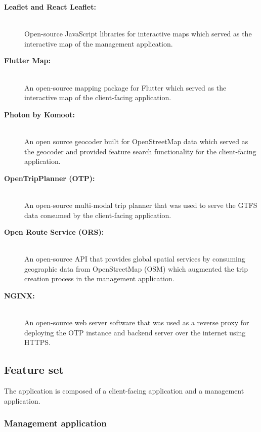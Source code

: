 \documentclass{icsthesis}
\begin{document}
\begin{mainmatter}
\begin{description}
			\item[\textbf{Leaflet and React Leaflet:}] \hfill \\
				Open-source JavaScript libraries for interactive maps which served as the interactive map of the management application.
		
			\item[\textbf{Flutter Map:}] \hfill \\
				An open-source mapping package for Flutter which served as the interactive map of the client-facing application.
		
			\item[\textbf{Photon by Komoot:}] \hfill \\
				An open source geocoder built for OpenStreetMap data which served as the geocoder and provided feature search functionality for the client-facing application.
		
			\item[\textbf{OpenTripPlanner (OTP):}] \hfill \\
				An open-source multi-modal trip planner that was used to serve the GTFS data consumed by the client-facing application.
		
			\item[\textbf{Open Route Service (ORS):}] \hfill \\
				An open-source API that provides global spatial services by consuming geographic data from OpenStreetMap (OSM) which augmented the trip creation process in the management application.
		
			\item[\textbf{NGINX:}] \hfill \\
				An open-source web server software that was used as a reverse proxy for deploying the OTP instance and backend server over the internet using HTTPS.
		\end{description}
		
		\subsection{Feature set}
		The application is composed of a client-facing application and a management application.
		
		\subsubsection{\textbf{Management application}}
		

\end{mainmatter}
\end{document}
